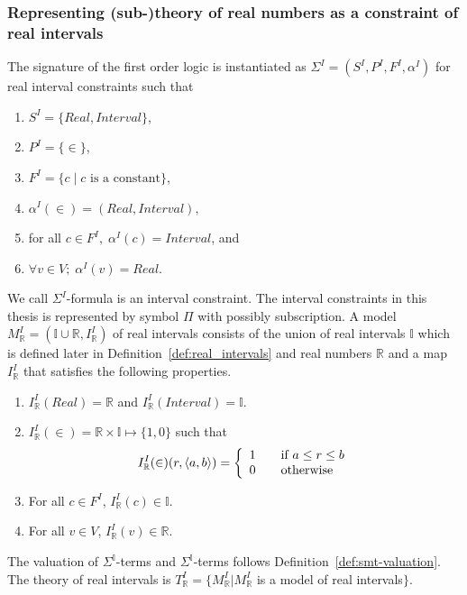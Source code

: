 \subsubsection*{Representing (sub-)theory of real numbers as a constraint of real intervals}
The signature of the first order logic is instantiated as $\Sigma^I = (S^I, P^I, F^I, \alpha^I)$ for real interval constraints such that
\begin{enumerate}
\item $S^I = \{Real, Interval\}$,
\item $P^I = \{\in\}$,
\item $F^I = \{c \mid c \text{ is a constant}\}$,
\item $\alpha^I(\in) = (Real, Interval)$,
\item for all $c \in F^I, \; \alpha^I(c) = Interval$, and 
\item $\forall v \in V; \; \alpha^I(v) = Real$.
\end{enumerate}
We call $\Sigma^I$-formula is an interval constraint. The interval constraints in this thesis is represented by symbol $\Pi$ with possibly subscription.
A model $M^I_{\mathbb{R}} = (\mathbb{I} \cup \mathbb{R}, I^I_\mathbb{R})$ of real intervals consists of the union of real intervals $\mathbb{I}$ which is defined later in Definition~\ref{def:real_intervals} and real numbers $\mathbb{R}$ and a map $I^I_\mathbb{R}$ that satisfies the following properties.
\begin{enumerate}
\item $I^I_\mathbb{R}(Real) = \mathbb{R}$ and $I^I_\mathbb{R}(Interval) = \mathbb{I}$.
\item $I^I_\mathbb{R}(\in) = \mathbb{R} \times \mathbb{I} \mapsto \{1, 0\}$ such that \[I_\mathbb{R}^I(\in)(r, \langle a, b \rangle) = \left\{ 
  \begin{array}{c l}
    1 & \quad \text{if } a \le r \le b\\
    0 & \quad \text{otherwise }\\
  \end{array} \right.\]
\item For all $c \in F^I$, $I^I_\mathbb{R}(c) \in \mathbb{I}$.
\item For all $v \in V$, $I^I_\mathbb{R}(v) \in \mathbb{R}$.
\end{enumerate}
The valuation of $\Sigma^\mathbb{I}$-terms and $\Sigma^\mathbb{I}$-terms follows Definition~\ref{def:smt-valuation}. The theory of real intervals is $T^I_\mathbb{R} = \{M^I_\mathbb{R} | M^I_\mathbb{R}$ is a model of real intervals$\}$.
